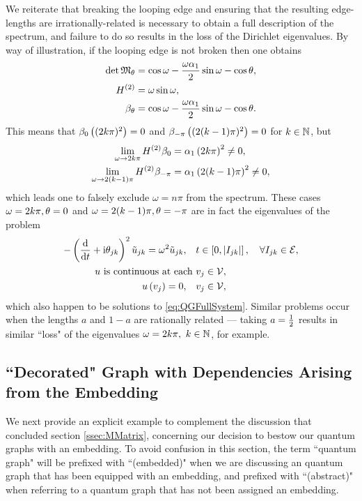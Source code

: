 We reiterate that breaking the looping edge and ensuring that the resulting edge-lengths are irrationally-related is necessary to obtain a full description of the spectrum, and failure to do so results in the loss of the Dirichlet eigenvalues.
By way of illustration, if the looping edge is not broken then one obtains
\begin{align*}
	\det\mathfrak{M}_{\theta} &= \cos\omega - \frac{\omega\alpha_1}{2}\sin\omega - \cos\theta, \\
	H^{(2)} &= \omega\sin\omega, \\
	\beta_{\theta} &= \cos\omega - \frac{\omega\alpha_1}{2}\sin\omega - \cos\theta.
\end{align*}
This means that $\beta_{0}\left( (2k\pi)^2 \right)=0$ and $\beta_{-\pi}\left( (2(k-1)\pi)^2 \right)=0$ for $k\in\mathbb{N}$, but 
\begin{align*}
	\lim_{\omega\rightarrow 2k\pi}H^{(2)}\beta_{0} &= \alpha_1\left( 2k\pi \right)^2 \neq 0, \\
	\lim_{\omega\rightarrow 2(k-1)\pi} H^{(2)}\beta_{-\pi} &= \alpha_1\left( 2(k-1)\pi \right)^2 \neq 0,
\end{align*}
which leads one to falsely exclude $\omega=n\pi$ from the spectrum.
These cases $\omega=2k\pi, \theta=0$ and $\omega=2(k-1)\pi, \theta=-\pi$ are in fact the eigenvalues of the problem
\begin{align*}
	-\left( \dfrac{\mathrm{d}}{\mathrm{d}t} + \mathrm{i}\theta_{jk} \right)^2 \tilde{u}_{jk} = \omega^2 \tilde{u}_{jk}, \quad &t\in\left[ 0,\left\lvert I_{jk} \right\rvert \right], \quad \forall I_{jk}\in \mathcal{E}, \\
	u \text{ is continuous at each } &v_j \in \mathcal{V}, \\
	u\left( v_j \right) = 0, \quad &v_j\in\mathcal{V},
\end{align*}
which also happen to be solutions to \eqref{eq:QGFullSystem}.
Similar problems occur when the lengths $a$ and $1-a$ are rationally related --- taking $a=\frac{1}{2}$ results in similar ``loss" of the eigenvalues $\omega=2k\pi, \ k\in\naturals$, for example.

\subsection{``Decorated" Graph with Dependencies Arising from the Embedding} \label{ssec:EmbeddingDependentExample}
We next provide an explicit example to complement the discussion that concluded section \ref{ssec:MMatrix}, concerning our decision to bestow our quantum graphs with an embedding. 
To avoid confusion in this section, the term ``quantum graph" will be prefixed with ``(embedded)" when we are discussing an quantum graph that has been equipped with an embedding, and prefixed with ``(abstract)" when referring to a quantum graph that has not been assigned an embedding.

